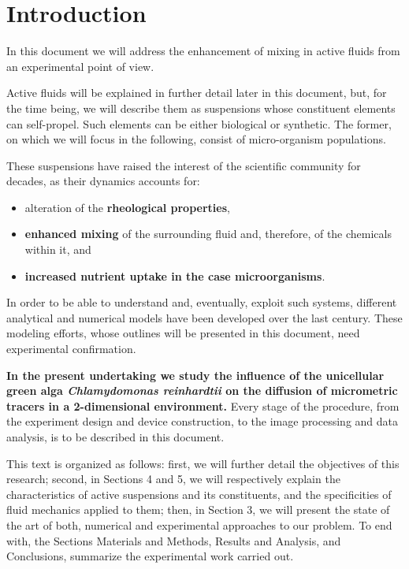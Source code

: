 \chapter{Introduction}
\label{introduction}

In this document we will address the enhancement of mixing in active fluids from an experimental point of view. 

Active fluids will be explained in further detail later in this document, but, for the time being, we will describe them as suspensions whose constituent elements can self-propel. Such elements can be either biological or synthetic. The former, on which we will focus in the following, consist of micro-organism populations.

These suspensions have raised the interest of the scientific community for decades, as their dynamics accounts for:

\begin{itemize}
	\item alteration of the \textbf{rheological properties},
	\item \textbf{enhanced mixing} of the surrounding fluid and, therefore, of the chemicals within it, and
	\item \textbf{increased nutrient uptake in the case microorganisms}.
\end{itemize}

In order to be able to understand and, eventually, exploit such systems, different analytical and numerical models have been developed over the last century. These modeling efforts, whose outlines will be presented in this document, need experimental confirmation.

\textbf{In the present undertaking we study the influence of the unicellular green alga \textit{Chlamydomonas reinhardtii} on the diffusion of micrometric tracers in a 2-dimensional environment.} 
Every stage of the procedure, from the experiment design and device construction, to the image processing and data analysis, is to be described in this document.

This text is organized as follows: first, we will further detail the objectives of this research; second,  in Sections 4 and 5, we will respectively explain the characteristics of active suspensions and its constituents, and the specificities of fluid mechanics applied to them; then, in Section 3, we will present the state of the art of both, numerical and experimental approaches to our problem. To end with, the Sections Materials and Methods, Results and Analysis, and Conclusions, summarize the experimental work carried out. 